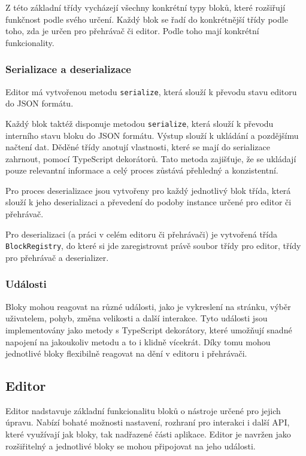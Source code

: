 Z této základní třídy vycházejí všechny konkrétní typy bloků, které rozšiřují funkčnost podle svého určení.
Každý blok se řadí do konkrétnější třídy podle toho, zda je určen pro přehrávač či editor.
Podle toho mají konkrétní funkcionality.

\subsubsection{Serializace a deserializace}

Editor má vytvořenou metodu \texttt{serialize}, která slouží k převodu stavu editoru do JSON formátu.

Každý blok taktéž disponuje metodou \texttt{serialize}, která slouží k převodu interního stavu bloku do JSON formátu. 
Výstup slouží k ukládání a pozdějšímu načtení dat. 
Děděné třídy anotují vlastnosti, které se mají do serializace zahrnout, pomocí TypeScript dekorátorů. 
Tato metoda zajišťuje, že se ukládají pouze relevantní informace a celý proces zůstává přehledný a konzistentní.

Pro proces deserializace jsou vytvořeny pro každý jednotlivý blok třída, která slouží k jeho deserializaci a převedení do podoby instance určené pro editor či přehrávač.

Pro deserializaci (a práci v celém editoru či přehrávači) je vytvořená třída \texttt{BlockRegistry}, do které si jde zaregistrovat právě soubor třídy pro editor, třídy pro přehrávač a deserializer. 

\subsubsection{Události}

Bloky mohou reagovat na různé události, jako je vykreslení na stránku, výběr uživatelem, pohyb, změna velikosti a další interakce.
Tyto události jsou implementovány jako metody s TypeScript dekorátory, které umožňují snadné napojení na jakoukoliv metodu a to i klidně vícekrát.
Díky tomu mohou jednotlivé bloky flexibilně reagovat na dění v editoru i přehrávači.

\subsection{Editor}

Editor nadstavuje základní funkcionalitu bloků o nástroje určené pro jejich úpravu. 
Nabízí bohaté možnosti nastavení, rozhraní pro interakci i další API, které využívají jak bloky, tak nadřazené části aplikace.
Editor je navržen jako rozšiřitelný a jednotlivé bloky se mohou připojovat na jeho události.

